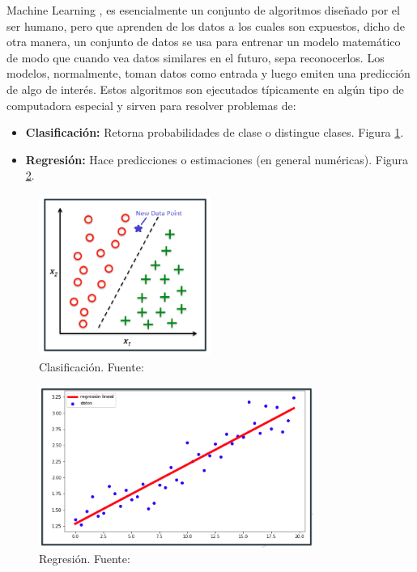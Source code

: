 Machine Learning \cite{ml}, es esencialmente un conjunto de algoritmos diseñado por el ser humano, pero que aprenden de los datos a los cuales son expuestos, dicho de otra manera, un conjunto de datos se usa para entrenar un modelo matemático de modo que cuando vea datos similares en el futuro, sepa reconocerlos. Los modelos, normalmente, toman datos como entrada y luego emiten una predicción de algo de interés. Estos algoritmos son ejecutados típicamente en algún tipo de computadora especial y sirven para resolver problemas de:
\begin{itemize}
    \item \textbf{Clasificación:} Retorna probabilidades de clase o distingue clases. Figura \ref{fig:clasificacion}.
    \item \textbf{Regresión:} Hace predicciones o estimaciones (en general numéricas). Figura \ref{fig:regresion}.
\end{itemize}

\begin{figure}[h!]
    \centering
    \includegraphics[width=0.5\textwidth]{img/clasificacion.png}
    \caption{Clasificación. Fuente: \cite{aprendisajesup}}
    \label{fig:clasificacion}
\end{figure}

\begin{figure}[h!]
    \centering
    \includegraphics[width=0.8\textwidth]{img/regresion.png}
    \caption{Regresión. Fuente: \cite{aprendisajesup}}
    \label{fig:regresion}
\end{figure}

